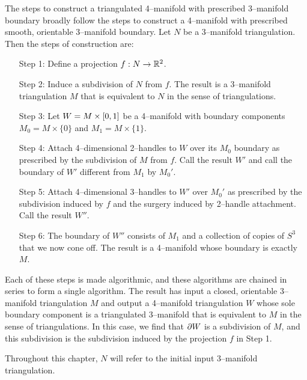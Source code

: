 \label{chapter:triangulation}

The steps to construct a triangulated 4--manifold with prescribed 3--manifold boundary broadly follow the steps to construct a 4--manifold with prescribed smooth, orientable 3--manifold boundary.
Let $N$ be a 3--manifold triangulation.
Then the steps of construction are:
\begin{enumerate}
	\item[Step 1:] Define a projection $f:N\to\mathbb{R}^2$.
	
	\item[Step 2:] Induce a subdivision of $N$ from $f$.  The result is a 3--manifold triangulation $M$ that is equivalent to $N$ in the sense of triangulations.

	\item[Step 3:] Let $W=M\times[0,1]$ be a 4--manifold with boundary components $M_0 = M\times\{0\}$ and $M_1 = M\times\{1\}$.
	
	\item[Step 4:] Attach 4--dimensional 2--handles to $W$ over its $M_0$ boundary as prescribed by the subdivision of $M$ from $f$.  Call the result $W'$ and call the boundary of $W'$ different from $M_1$ by $M_0'$.
	
	\item[Step 5:] Attach 4--dimensional 3--handles to $W'$ over $M_0'$ as prescribed by the subdivision induced by $f$ and the surgery induced by 2--handle attachment.  Call the result $W''$.
	
	\item[Step 6:] The boundary of $W''$ consists of $M_1$ and a collection of copies of $S^3$ that we now cone off.  The result is a 4--manifold whose boundary is exactly $M$.
\end{enumerate}

Each of these steps is made algorithmic, and these algorithms are chained in series to form a single algorithm.
The result has input a closed, orientable 3--manifold triangulation $M$ and output a 4--manifold triangulation $W$ whose sole boundary component is a triangulated 3--manifold that is equivalent to $M$ in the sense of triangulations.
In this case, we find that $\partial W$ is a subdivision of $M$, and this subdivision is the subdivision induced by the projection $f$ in Step 1.

Throughout this chapter, $N$ will refer to the initial input 3--manifold triangulation.













